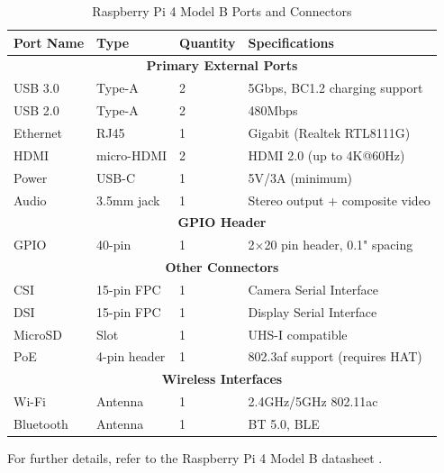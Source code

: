{	\begin{table}[h!]
		\centering
		\caption{Raspberry Pi 4 Model B Ports and Connectors}
		\label{table:rpi4_ports}
		\begin{tabular}{|l|l|l|l|}
			\hline
			\textbf{Port Name} & \textbf{Type} & \textbf{Quantity} & \textbf{Specifications} \\ \hline
			\multicolumn{4}{|c|}{\textbf{Primary External Ports}} \\ \hline
			USB 3.0 & Type-A & 2 & 5Gbps, BC1.2 charging support \\ \hline
			USB 2.0 & Type-A & 2 & 480Mbps \\ \hline
			Ethernet & RJ45 & 1 & Gigabit (Realtek RTL8111G) \\ \hline
			HDMI & micro-HDMI & 2 & HDMI 2.0 (up to 4K@60Hz) \\ \hline
			Power & USB-C & 1 & 5V/3A (minimum) \\ \hline
			Audio & 3.5mm jack & 1 & Stereo output + composite video \\ \hline
			\multicolumn{4}{|c|}{\textbf{GPIO Header}} \\ \hline
			GPIO & 40-pin & 1 & 2×20 pin header, 0.1" spacing \\ \hline
			\multicolumn{4}{|c|}{\textbf{Other Connectors}} \\ \hline
			CSI & 15-pin FPC & 1 & Camera Serial Interface \\ \hline
			DSI & 15-pin FPC & 1 & Display Serial Interface \\ \hline
			MicroSD & Slot & 1 & UHS-I compatible \\ \hline
			PoE & 4-pin header & 1 & 802.3af support (requires HAT) \\ \hline
			\multicolumn{4}{|c|}{\textbf{Wireless Interfaces}} \\ \hline
			Wi-Fi & Antenna & 1 & 2.4GHz/5GHz 802.11ac \\ \hline
			Bluetooth & Antenna & 1 & BT 5.0, BLE \\ \hline
		\end{tabular}
	\end{table}
	
	For further details, refer to the Raspberry Pi 4 Model B datasheet  \cite{Raspberry}.
}


